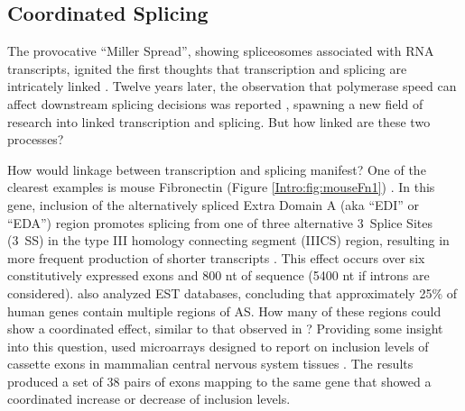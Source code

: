   \subsection{Coordinated Splicing}\label{Intro:subsec:Coordination in splicing}

    The provocative ``Miller Spread'', showing spliceosomes associated with RNA transcripts, ignited the first thoughts that transcription and splicing are intricately linked \citep{Osheim1985}. Twelve years later, the observation that polymerase speed can affect downstream splicing decisions was reported \citep{Cramer1997}, spawning a new field of research into linked transcription and splicing. But how linked are these two processes? 

    How would linkage between transcription and splicing manifest? One of the clearest examples is mouse Fibronectin \fn{} (Figure \ref{Intro:fig:mouseFn1}) \citep{Schwarzbauer1983, White2011a}. In this gene, inclusion of the alternatively spliced Extra Domain A (aka ``EDI'' or ``EDA'') region promotes splicing from one of three alternative 3\textprime~Splice Sites (3\textprime~SS) in the type III homology connecting segment (IIICS) region, resulting in more frequent production of shorter transcripts \citep{Fededa2005}. This effect occurs over six constitutively expressed exons and 800 nt of sequence (5400 nt if introns are considered). \citep{Fededa2005} also analyzed EST databases, concluding that approximately 25\% of human genes contain multiple regions of AS. How many of these regions could show a coordinated effect, similar to that observed in \fn{}? Providing some insight into this question, \citep{Fagnani2007} used microarrays designed to report on inclusion levels of cassette exons in mammalian central nervous system tissues \citep{Fagnani2007}. The results produced a set of 38 pairs of exons mapping to the same gene that showed a coordinated increase or decrease of inclusion levels. 


